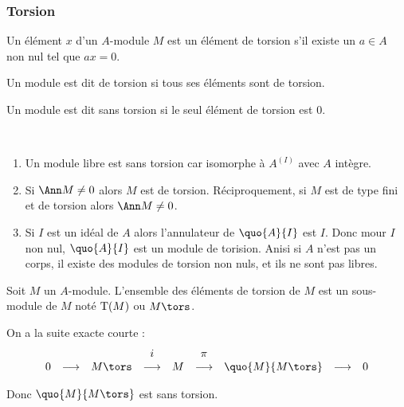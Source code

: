 \subsubsection{Torsion}
\vspace{0.5em}

\begin{defi}
 
Un élément $x$ d'un $A$-module $M$ est un élément de torsion s'il existe un
$a\in A$ non nul tel que $ax = 0$.

Un module est dit de torsion si tous ses éléments sont de torsion.

Un module est dit sans torsion si le seul élément de torsion est $0$.
\end{defi}

\begin{example}[Remarques]\
 
 \begin{enumerate}
  \item Un module libre est sans torsion car isomorphe à $A^{(I)}$ avec $A$
intègre.
\item Si $\Ann M \neq 0$ alors $M$ est de torsion. Réciproquement, si $M$ est
de type fini et de torsion alors $\Ann M \neq 0$.
\item Si $I$ est un idéal de $A$ alors l'annulateur de $\quo{A}{I}$ est $I$.
Donc mour $I$ non nul, $\quo{A}{I}$ est un module de torision. Anisi si $A$
n'est pas un corps, il existe des modules de torsion non nuls, et ils ne sont
pas libres.
 \end{enumerate}
\end{example}

\begin{defiprop}
 
 Soit $M$ un $A$-module. L'ensemble des éléments de torsion de $M$ est un
sous-module de $M$ noté $\textnormal {T}(M)$ ou $M\tors$.
\end{defiprop}

\begin{example}[Remarque] On a la suite exacte courte :
\vspace{-1em}
 \begin{displaymath}
\begin{array}{ccccccccc}
  &                &        & i             & & \pi & & & \\
0 &\longrightarrow & M\tors &\longrightarrow&M&\longrightarrow
&\quo{M}{M\tors}&\longrightarrow& 0
 \end{array} \end{displaymath}

Donc $\quo{M}{M\tors}$ est sans torsion.
\end{example}

